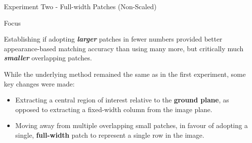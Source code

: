 \documentclass[10pt, compress]{beamer}
\begin{document}
\begin{frame}{Experiment Two - Full-width Patches (Non-Scaled)}

\begin{block}{Focus}

Establishing if adopting \textbf{\textit{larger}} patches in fewer numbers provided better appearance-based matching accuracy than using many more, but critically much \textbf{\textit{smaller}} overlapping patches.
	
\end{block}

While the underlying method remained the same as in the first experiment, some key changes were made:

 \begin{itemize}[label={\textbullet}]
  	\item Extracting a central region of interest relative to the \textbf{ground plane}, as opposed to extracting a fixed-width column from the image plane.
  	\item Moving away from multiple overlapping small patches, in favour of adopting a single, \textbf{full-width} patch to represent a single row in the image.
  \end{itemize}

\end{frame}
\end{document}
